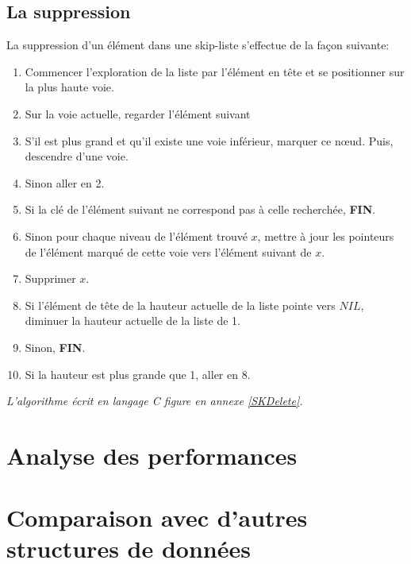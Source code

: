 \documentclass[hidelinks,a4paper, 12pt]{article}
\begin{document}
	\subsection{La suppression}
	La suppression d'un élément dans une skip-liste s'effectue de la façon suivante:
	\begin{enumerate}
		\item Commencer l'exploration de la liste par l'élément en tête et se positionner sur la plus haute voie.
		\item Sur la voie actuelle, regarder l'élément suivant
		\item S'il est plus grand et qu'il existe une voie inférieur, marquer ce nœud. Puis, descendre d'une voie.
		\item Sinon aller en 2.
		\item Si la clé de l'élément suivant ne correspond pas à celle recherchée, \textbf{FIN}.
		\item Sinon pour chaque niveau de l'élément trouvé $x$, mettre à jour les pointeurs de l'élément marqué de cette voie vers l'élément suivant de $x$.
		\item Supprimer $x$.
		\item Si l'élément de tête de la hauteur actuelle de la liste pointe vers $NIL$, diminuer la hauteur actuelle de la liste de 1.
		\item Sinon, \textbf{FIN}.
		\item Si la hauteur est plus grande que 1, aller en 8.
	\end{enumerate}
	\emph{L'algorithme écrit en langage C figure en annexe \ref{SKDelete}.}
	
	\section{Analyse des performances}\label{perf}
	\section{Comparaison avec d'autres structures de données}
	
\end{document}
